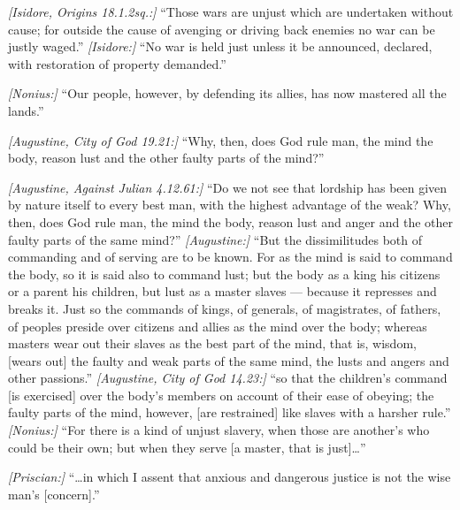  \textit{[Isidore, Origins 18.1.2sq.:]} ``Those wars are unjust which are undertaken without cause; for outside the cause of avenging or driving back enemies no war can be justly waged.'' \textit{[Isidore:]} ``No war is held just unless it be announced, declared, with restoration of property demanded.''

 \textit{[Nonius:]} ``Our people, however, by defending its allies, has now mastered all the lands.''

 \textit{[Augustine, City of God 19.21:]} ``Why, then, does God rule man, the mind the body, reason lust and the other faulty parts of the mind?''

 \textit{[Augustine, Against Julian 4.12.61:]} ``Do we not see that lordship has been given by nature itself to every best man, with the highest advantage of the weak? Why, then, does God rule man, the mind the body, reason lust and anger and the other faulty parts of the same mind?'' \textit{[Augustine:]} ``But the dissimilitudes both of commanding and of serving are to be known. For as the mind is said to command the body, so it is said also to command lust; but the body as a king his citizens or a parent his children, but lust as a master slaves --- because it represses and breaks it. Just so the commands of kings, of generals, of magistrates, of fathers, of peoples preside over citizens and allies as the mind over the body; whereas masters wear out their slaves as the best part of the mind, that is, wisdom, [wears out] the faulty and weak parts of the same mind, the lusts and angers and other passions.'' \textit{[Augustine, City of God 14.23:]} ``so that the children's command [is exercised] over the body's members on account of their ease of obeying; the faulty parts of the mind, however, [are restrained] like slaves with a harsher rule.'' \textit{[Nonius:]} ``For there is a kind of unjust slavery, when those are another's who could be their own; but when they serve [a master, that is just]\ldots''

 \textit{[Priscian:]} ``\ldots in which I assent that anxious and dangerous justice is not the wise man's [concern].''

